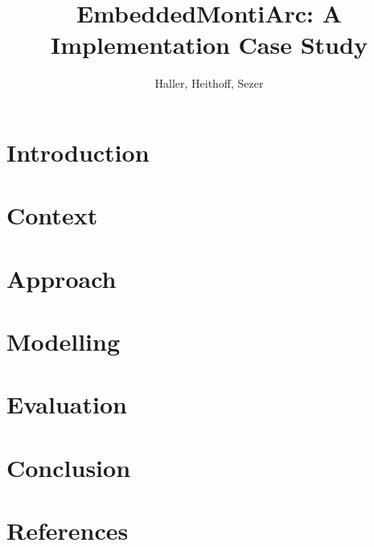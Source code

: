 \documentclass[review]{elsarticle}
\begin{document}
\begin{frontmatter}

\title{EmbeddedMontiArc: A Implementation Case Study}
\tnotetext[mytitlenote]{}

\author{Haller, Heithoff, Sezer}
\address{RWTH Aachen}



\begin{abstract}

\end{abstract}

\begin{keyword}

\end{keyword}

\end{frontmatter}

\linenumbers


\newpage
\section{Introduction}


\section{Context}


\section{Approach}


\section{Modelling}


\section{Evaluation}


\section{Conclusion}



\newpage
\section*{References}

\end{document}
